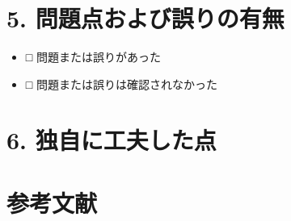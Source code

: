\documentclass[a4paper,12pt]{article}
\begin{document}

\section*{5. 問題点および誤りの有無}

\begin{itemize}
  \item □ 問題または誤りがあった
  \item □ 問題または誤りは確認されなかった
\end{itemize}

\section*{6. 独自に工夫した点}

\section*{参考文献}
\end{document}
